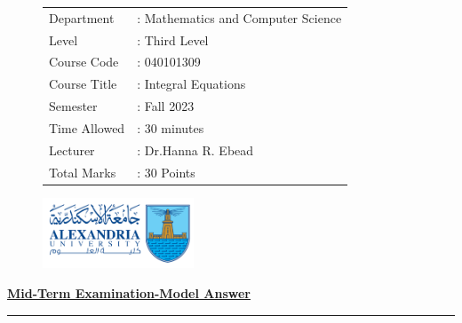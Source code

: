\documentclass[]{article}
\begin{document}
\thispagestyle{empty}
\begin{figure}
    \begin{minipage}{0.7\textwidth}
        \begin{tabular}{l l}
            Department   & : Mathematics and Computer Science \\
            Level        & : Third Level                      \\
            Course Code  & : 040101309                        \\
            Course Title & :  Integral Equations              \\
            Semester     & : Fall 2023                        \\
            Time Allowed & : 30 minutes                       \\
            Lecturer     & : Dr.Hanna R. Ebead                \\
            Total Marks  & : 30 Points                        \\
        \end{tabular}
    \end{minipage}%
    \begin{minipage}{0.3\textwidth}
        \includegraphics[width=4.5cm]{collagelogo.png}
    \end{minipage}
\end{figure}
\vspace*{-1cm}
\begin{center}
    \textbf{\underline{\LARGE Mid-Term Examination-Model Answer}}
\end{center}
\vspace*{.2cm}

\hrule
\end{document}
